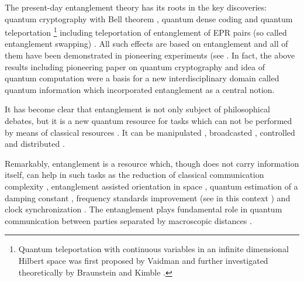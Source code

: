 \documentclass[twocolumn,aps,rmp]{revtex4}
\begin{document}
The present-day entanglement theory has its roots in the key
discoveries: quantum cryptography with Bell theorem \cite{E91},
quantum dense coding \cite{BennettW} and quantum teleportation
\cite{Teleportation}\footnote{Quantum teleportation with continuous
  variables in an infinite dimensional Hilbert space was first
  proposed by Vaidman \cite{Vaidman} and further investigated
  theoretically by Braunstein and Kimble \cite{BraunsteinKt}.}
including teleportation of entanglement of EPR pairs (so called
entanglement swapping)
\cite{Yurke,YurkeStoller_ent_swapping,ent_swapping,BoseWKt}.  All such
effects are based on entanglement and all of them have been
demonstrated in pioneering experiments (see \cite
{Kimble-teleportation,Rzym-teleportation,Wieden-teleportation,JenSWWZ-exp,NaikPWBK,TittelBZG,MattleWKZ1996,exp_ent_swapping}.
In fact, the above results including pioneering paper on quantum
cryptography \cite{BB84} and idea of quantum computation
\cite{Feynman,DDeutsch,Shor,Steane-codes-prl} were a basis for a new
interdisciplinary domain called quantum information \cite
{Nielsen-Chuang,Alber2001,BouwmeesterEZ-book,BraunsteinP,LoSPbook,DagBook}
which incorporated entanglement as a central notion.

It has become clear that entanglement is not only subject of
philosophical debates, but it is a new quantum resource for tasks
which can not be performed by means of classical resources \cite
{Bennett98}. It can be manipulated \cite
{BBPSSW1996,BDSW1996,Popescu2,Gisin96,RaimondBH}, broadcasted
\cite{Buzek-local-cloning}, controlled and distributed
\cite{CiracZ,MandilaraAKK2007,BeigeBBHKPV2000}.

Remarkably, entanglement is a resource which, though does not carry
information itself, can help in such tasks as the reduction of
classical communication complexity
\cite{CBcom_cplx_1,BuhrmanCD1997-complexity,BruknerZPZ2002-Bell-complexity},
entanglement assisted orientation in space
\cite{BrukerPRV2005-orientation,BovinoGSV2006-orientation-exp}, quantum estimation of a damping constant \cite{VenzlF2007},
frequency standards improvement
\cite{Wineland,GiovannettiLM2004-sci-metrology,HuelgaFreqSt} (see in
this context \cite{BotoLithography}) and clock synchronization
\cite{JozsaADW2000-synchr}. The entanglement plays fundamental role in
quantum communication between parties separated by macroscopic
distances \cite {BDSW1996}.
\end{document}
